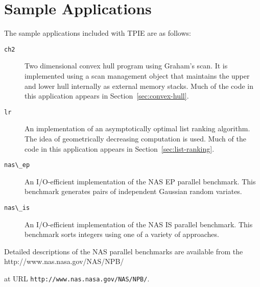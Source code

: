 \section{Sample Applications}

The sample applications included with TPIE are as follows:

\begin{description}
\item[\verb|ch2|] Two dimensional convex hull
  program using Graham's scan.  It is implemented using a scan
  management object that maintains the upper and lower hull internally
  as external memory stacks.  Much of the code in this application
  appears in Section~\ref{sec:convex-hull}.
\item[\verb|lr|] An implementation of an asymptotically optimal list
  ranking  algorithm.  The idea of geometrically
  decreasing computation is used.  Much of the code in this
  application appears in Section~\ref{sec:list-ranking}.
\item[\verb|nas\_ep|] An I/O-efficient implementation of the NAS EP
  parallel benchmark.  This benchmark generates pairs of independent
  Gaussian random variates.
\item[\verb|nas\_is|] An I/O-efficient implementation of the NAS IS
  parallel benchmark.  This benchmark sorts integers using one of a
  variety of approaches.
\end{description}

Detailed descriptions of the NAS parallel benchmarks are available
from the %
{http://www.nas.nasa.gov/NAS/NPB/}
\begin{latexonly}
at URL \verb|http://www.nas.nasa.gov/NAS/NPB/|.
\end{latexonly}
